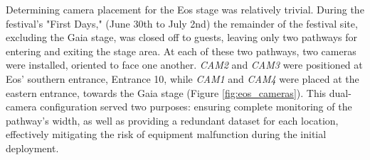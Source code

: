 Determining camera placement for the Eos stage was relatively trivial. During the festival's "First Days," (June 30th to July 2nd) the remainder of the festival site, excluding the Gaia stage, was closed off to guests, leaving only two pathways for entering and exiting the stage area. At each of these two pathways, two cameras were installed, oriented to face one another. \textit{CAM2} and \textit{CAM3} were positioned at Eos' southern entrance, Entrance 10, while \textit{CAM1} and \textit{CAM4} were placed at the eastern entrance, towards the Gaia stage (Figure \ref{fig:eos_cameras}). This dual-camera configuration served two purposes: ensuring complete monitoring of the pathway's width, as well as providing a redundant dataset for each location, effectively mitigating the risk of equipment malfunction during the initial deployment.

